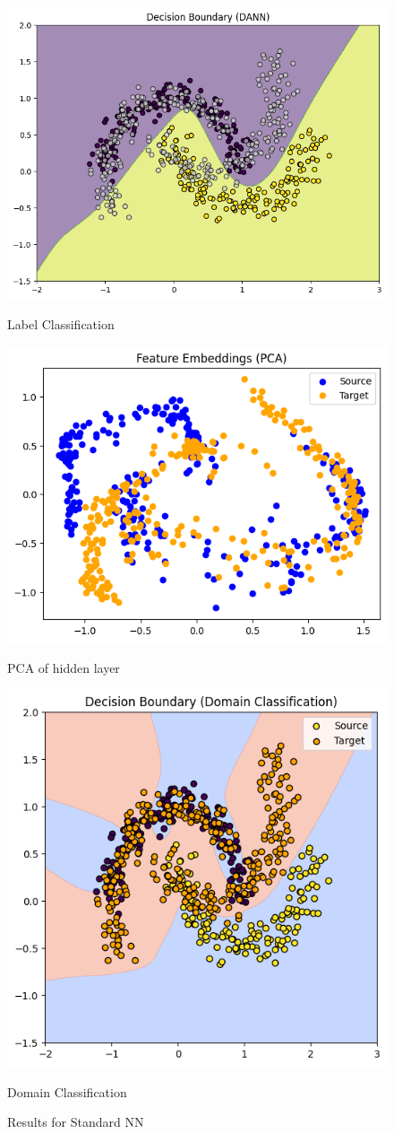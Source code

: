 \documentclass{article}
\begin{document}
\begin{figure}
\centering
\begin{minipage}{0.32\linewidth}
\centering
\includegraphics[width=0.7\linewidth]{DANN/label_decision_vanilla.png}
\caption{\small Label Classification}
\label{fig:label_decision_vanilla}
\end{minipage}
\hfill
\begin{minipage}{0.32\linewidth}
\centering
\includegraphics[width=0.7\linewidth]{DANN/feature_vanilla.png}
\caption{\small PCA of hidden layer}
\label{fig:feature_vanilla}
\end{minipage}
\hfill
\begin{minipage}{0.32\linewidth}
\centering
\includegraphics[width=0.55\linewidth]{DANN/domain_deciison_vanilla.png}
\caption{\small Domain Classification}
\label{fig:domain_decision_vanilla}
\end{minipage}
\caption{\small Results for Standard NN}
\label{fig:vanilla}
\end{figure}
\end{document}
